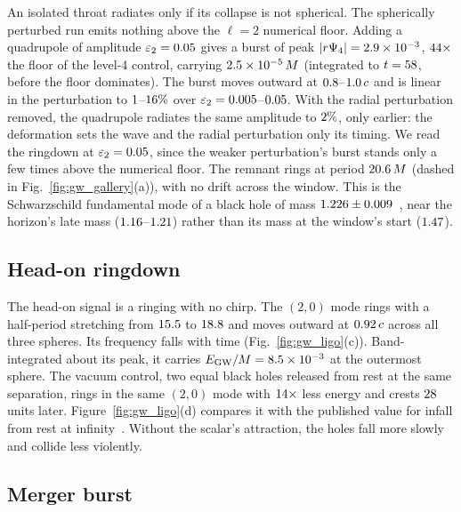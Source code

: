 \documentclass[twocolumn,floatfix,aps,prd,superscriptaddress,nofootinbib,showkeys]{revtex4-2}
\begin{document}
An isolated throat radiates only if its collapse is not spherical. The spherically perturbed run emits nothing above the $\ell=2$ numerical floor. Adding a quadrupole of amplitude $\varepsilon_2=0.05$ gives a burst of peak $|r\Psi_4|=2.9\times10^{-3}$, $44\times$ the floor of the level-4 control, carrying $2.5\times10^{-5}\,M$ (integrated to $t=58$, before the floor dominates). The burst moves outward at $0.8$--$1.0\,c$ and is linear in the perturbation to $1$--$16\%$ over $\varepsilon_2=0.005$--$0.05$. With the radial perturbation removed, the quadrupole radiates the same amplitude to $2\%$, only earlier: the deformation sets the wave and the radial perturbation only its timing. We read the ringdown at $\varepsilon_2=0.05$, since the weaker perturbation's burst stands only a few times above the numerical floor. The remnant rings at period $20.6\,M$ (dashed in Fig.~\ref{fig:gw_gallery}(a)), with no drift across the window. This is the Schwarzschild fundamental mode of a black hole of mass $1.226\pm0.009$~\cite{berti2009}, near the horizon's late mass ($1.16$--$1.21$) rather than its mass at the window's start ($1.47$).

\subsection{Head-on ringdown}
\label{sec:headon:wave}

The head-on signal is a ringing with no chirp. The $(2,0)$ mode rings with a half-period stretching from $15.5$ to $18.8$ and moves outward at $0.92\,c$ across all three spheres. Its frequency falls with time (Fig.~\ref{fig:gw_ligo}(c)). Band-integrated about its peak, it carries $E_{\rm GW}/M=8.5\times10^{-3}$ at the outermost sphere. The vacuum control, two equal black holes released from rest at the same separation, rings in the same $(2,0)$ mode with $14\times$ less energy and crests $28$ units later. Figure~\ref{fig:gw_ligo}(d) compares it with the published value for infall from rest at infinity~\cite{witek2010}. Without the scalar's attraction, the holes fall more slowly and collide less violently.

\subsection{Merger burst}
\label{sec:spiral:burst}
\end{document}
